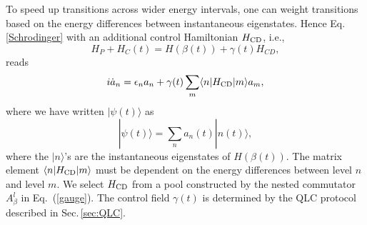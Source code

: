 \documentclass[twocolumn,aps,superscriptaddress,floatfix,longbibliography]{revtex4-2}
\newcommand{\la}{\langle}
\newcommand{\ra}{\rangle}
\newcommand{\awx}[1]{{\color[rgb]{.8,.6,.6}{\sout{#1}}}}
\newcommand{\Sec}[1]{Sec.\,\ref{#1}}
\newcommand{\Eq}[1]{Eq.\,\eqref{#1}}
\begin{document}



To speed up transitions across wider energy
intervals, one can weight transitions based on the
energy differences between instantaneous eigenstates.
Hence
\Eq{Schrodinger} with an additional control Hamiltonian $H_{\rm CD}$, i.e.,
\begin{equation}
    H_P + H_C(t) = H(\beta(t))+\gamma(t)H_{CD},
\end{equation}
reads
\begin{equation}
i\dot{a}_n=\epsilon_n a_n+ \gamma(t) \sum_m %
    \la n|H_{\rm CD} |m \ra a_m,
    \label{Schrodinger-amp1}
\end{equation}
where we have written $|\psi(t)\rangle$ as
$$
|\psi(t)\rangle = \sum_n a_n(t)|n(t)\rangle,
$$
where the $|n\ra$'s are the instantaneous eigenstates of
$H(\beta(t))$.  The matrix element $\la n|H_{\rm CD} |m \ra$
must be dependent on the energy differences between level $n$
and level $m$. We select $H_{\rm CD}$ from a pool constructed by the nested commutator
$A_{\beta}^{l}$ in Eq.~(\ref{gauge}). 
The control field
$\gamma(t)$ is determined by the QLC protocol described in
\Sec{sec:QLC}. %






\end{document}
